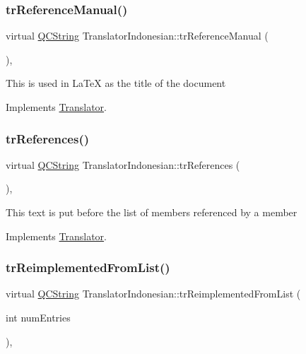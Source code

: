 \subsubsection{\texorpdfstring{trReferenceManual()}{trReferenceManual()}}
{\footnotesize\ttfamily virtual \mbox{\hyperlink{class_q_c_string}{Q\+C\+String}} Translator\+Indonesian\+::tr\+Reference\+Manual (\begin{DoxyParamCaption}{ }\end{DoxyParamCaption})\hspace{0.3cm}{\ttfamily [inline]}, {\ttfamily [virtual]}}

This is used in La\+TeX as the title of the document 

Implements \mbox{\hyperlink{class_translator}{Translator}}.

\mbox{\label{class_translator_indonesian_afea4957c5161b3be74909568bd3fea75}} 
\subsubsection{\texorpdfstring{trReferences()}{trReferences()}}
{\footnotesize\ttfamily virtual \mbox{\hyperlink{class_q_c_string}{Q\+C\+String}} Translator\+Indonesian\+::tr\+References (\begin{DoxyParamCaption}{ }\end{DoxyParamCaption})\hspace{0.3cm}{\ttfamily [inline]}, {\ttfamily [virtual]}}

This text is put before the list of members referenced by a member 

Implements \mbox{\hyperlink{class_translator}{Translator}}.

\mbox{\label{class_translator_indonesian_a743149faf3a9d82d10fafffd43acbf32}} 
\subsubsection{\texorpdfstring{trReimplementedFromList()}{trReimplementedFromList()}}
{\footnotesize\ttfamily virtual \mbox{\hyperlink{class_q_c_string}{Q\+C\+String}} Translator\+Indonesian\+::tr\+Reimplemented\+From\+List (\begin{DoxyParamCaption}\item[{int}]{num\+Entries }\end{DoxyParamCaption})\hspace{0.3cm}{\ttfamily [inline]}, {\ttfamily [virtual]}}

